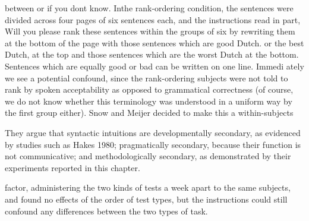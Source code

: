 \begin{styleStandard}
between or if you don{\textquotesingle}t know.{\textquotedbl} Inthe rank-ordering condition, the sentences were divided across four pages of six sentences each, and the instructions read in part, {\textquotedbl}Will you please rank these sentences within the groups of six by rewriting them at the bottom of the page with those sentences which are good Dutch. or the best Dutch, at the top and those sentences which are the worst Dutch at the bottom. Sentences which are equally good or bad can be written on one line.{\textquotedbl} Immedi\- ately we see a potential confound, since the rank-ordering subjects were not told to rank by spoken acceptability as opposed to grammatical correctness (of course, we do not know whether this terminology was understood in a uniform way by the first group either). Snow and Meijer decided to make this a within-subjects
\end{styleStandard}


\begin{listWWNumxliileveli}
\item 
\setcounter{listWWNumxliilevelii}{0}
\begin{listWWNumxliilevelii}
\item 
\begin{styleStandard}
They argue that syntactic intuitions are developmentally secondary, as evidenced by studies such as Hakes 1980; pragmatically secondary, because their function is not communicative; and methodologically secondary, as demonstrated by their experiments reported in this chapter.
\end{styleStandard}


\end{listWWNumxliilevelii}
\end{listWWNumxliileveli}
\clearpage\setcounter{page}{1}\begin{styleStandard}
factor, administering the two kinds of tests a week apart to the same subjects, and found no effects of the order of test types, but the instructions could still confound any differences between the two types of task.
\end{styleStandard}


